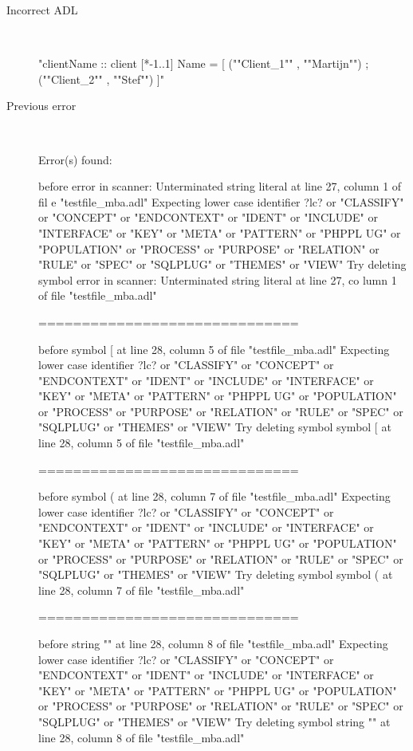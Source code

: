 \hrulefill

\begin{description}
  \item[Incorrect ADL]~\\
\begin{adl}
"clientName :: client [*-1..1] Name =
    [ (""Client_1""      , ""Martijn"")
    ; (""Client_2""      , ""Stef"")
    ]"\end{adl}
  \item[Previous error]~\\
\begin{haskell}
Error(s) found:

before error in scanner: Unterminated string literal at line 27, column 1 of fil
e "testfile_mba.adl"
Expecting lower case identifier ?lc? or "CLASSIFY" or "CONCEPT" or "ENDCONTEXT"
or "IDENT" or "INCLUDE" or "INTERFACE" or "KEY" or "META" or "PATTERN" or "PHPPL
UG" or "POPULATION" or "PROCESS" or "PURPOSE" or "RELATION" or "RULE" or "SPEC"
or "SQLPLUG" or "THEMES" or "VIEW"
Try deleting symbol error in scanner: Unterminated string literal at line 27, co
lumn 1 of file "testfile_mba.adl"

==============================

before symbol [ at line 28, column 5 of file "testfile_mba.adl"
Expecting lower case identifier ?lc? or "CLASSIFY" or "CONCEPT" or "ENDCONTEXT"
or "IDENT" or "INCLUDE" or "INTERFACE" or "KEY" or "META" or "PATTERN" or "PHPPL
UG" or "POPULATION" or "PROCESS" or "PURPOSE" or "RELATION" or "RULE" or "SPEC"
or "SQLPLUG" or "THEMES" or "VIEW"
Try deleting symbol symbol [ at line 28, column 5 of file "testfile_mba.adl"

==============================

before symbol ( at line 28, column 7 of file "testfile_mba.adl"
Expecting lower case identifier ?lc? or "CLASSIFY" or "CONCEPT" or "ENDCONTEXT"
or "IDENT" or "INCLUDE" or "INTERFACE" or "KEY" or "META" or "PATTERN" or "PHPPL
UG" or "POPULATION" or "PROCESS" or "PURPOSE" or "RELATION" or "RULE" or "SPEC"
or "SQLPLUG" or "THEMES" or "VIEW"
Try deleting symbol symbol ( at line 28, column 7 of file "testfile_mba.adl"

==============================

before string "" at line 28, column 8 of file "testfile_mba.adl"
Expecting lower case identifier ?lc? or "CLASSIFY" or "CONCEPT" or "ENDCONTEXT"
or "IDENT" or "INCLUDE" or "INTERFACE" or "KEY" or "META" or "PATTERN" or "PHPPL
UG" or "POPULATION" or "PROCESS" or "PURPOSE" or "RELATION" or "RULE" or "SPEC"
or "SQLPLUG" or "THEMES" or "VIEW"
Try deleting symbol string "" at line 28, column 8 of file "testfile_mba.adl"


\end{haskell}
\end{description}
